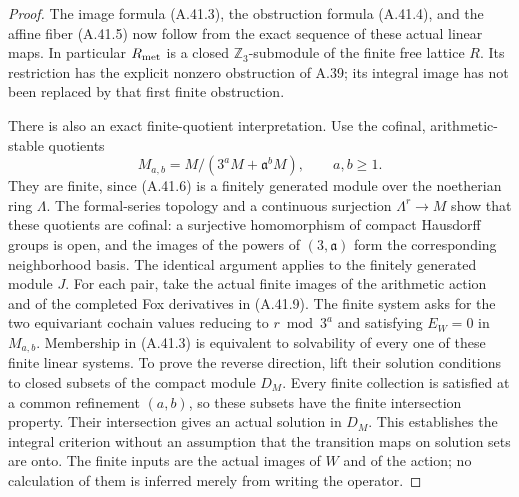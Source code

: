 \begin{proof}
The image formula (A.41.3), the obstruction formula
(A.41.4), and the affine fiber (A.41.5) now follow from the
exact sequence of these actual linear maps. In particular
$R_{\rm met}$ is a closed $\mathbb Z_3$-submodule of the
finite free lattice $R$. Its restriction has the explicit
nonzero obstruction of A.39; its integral image has not been
replaced by that first finite obstruction.

There is also an exact finite-quotient interpretation. Use
the cofinal, arithmetic-stable quotients
\[
                  M_{a,b}=M/(3^aM+\mathfrak a^bM),
                             \qquad a,b\ge1.
 \tag{A.41.11}
\]
They are finite, since (A.41.6) is a finitely generated
module over the noetherian ring $\Lambda$. The formal-series
topology and a continuous surjection $\Lambda^r\to M$
show that these quotients are cofinal: a surjective
homomorphism of compact Hausdorff groups is open, and
the images of the powers of $(3,\mathfrak a)$ form the
corresponding neighborhood basis. The identical argument
applies to the finitely generated module $J$. For each pair,
take the actual finite images of the arithmetic action and
of the completed Fox derivatives in (A.41.9). The finite
system asks for the two equivariant cochain values reducing
to $r\bmod3^a$ and satisfying $E_W=0$ in $M_{a,b}$.
Membership in (A.41.3) is equivalent to solvability of every
one of these finite linear systems. To prove the reverse
direction, lift their solution conditions to closed subsets
of the compact module $D_M$. Every finite collection is
satisfied at a common refinement $(a,b)$, so these subsets
have the finite intersection property. Their intersection
gives an actual solution in $D_M$. This establishes the
integral criterion without an assumption that the transition
maps on solution sets are onto. The finite inputs are the
actual images of $W$ and of the action; no calculation of
them is inferred merely from writing the operator.
\end{proof}

